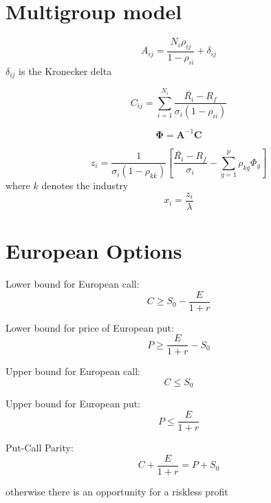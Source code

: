 \documentclass[]{amsart}
\newcommand{\p}[1]{\left(#1\right)}
\newcommand{\bs}[1]{\boldsymbol{#1}}
\begin{document}
\section{Multigroup model}
	
$$ A_{ij} = \frac{N_i \rho_{ij}}{1-\rho_{ii}} + \delta_{ij} $$ 
$\delta_{ij}$ is the Kronecker delta 

$$ C_{ij} = \sum_{i=1}^{N_i} \frac{\bar{R_i}-R_f}{\sigma_i \p{1-\rho_{ii}}} $$

$$ \bs{\Phi} = \bs{A}^{-1}\bs{C} $$

$$ z_i = \frac{1}{\sigma_i \p{1-\rho_{kk}}} \left[ \frac{\bar{R_i}-R_f}{\sigma_i} - \sum_{g=1}^p \rho_{kg} \Phi_g \right] $$ 
where $k$ denotes the industry 
$$ x_i = \frac{z_i}{\lambda} $$ 




\section{European Options}
Lower bound for European call:
$$ C \geq S_0 - \frac{E}{1+r} $$ 

Lower bound for price of European put: 
$$ P \geq \frac{E}{1+r} - S_0 $$ 


Upper bound for European call:
$$ C \leq S_0 $$ 

Upper bound for European put: 
$$ P \leq \frac{E}{1+r} $$ 

Put-Call Parity:
$$ C + \frac{E}{1+r} = P + S_0 $$ 

otherwise there is an opportunity for a riskless profit 
\end{document}

